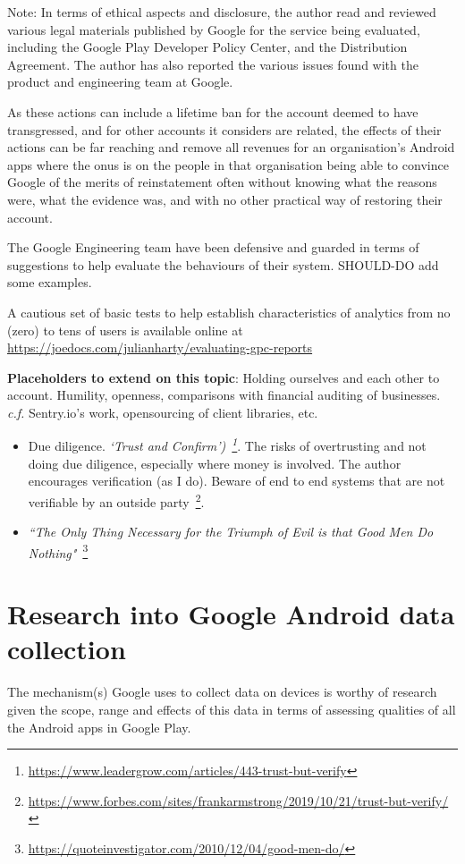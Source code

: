 Note: In terms of ethical aspects and disclosure, the author read and reviewed various legal materials published by Google for the service being evaluated, including the Google Play Developer Policy Center\citep{google_play_developer_policy_center}, and the Distribution Agreement\citep{google_play_developer_distribution_agreement}. The author has also reported the various issues found with the product and engineering team at Google.




As these actions can include a lifetime ban for the account deemed to have transgressed, and for other accounts it considers are related, the effects of their actions can be far reaching and remove all revenues for an organisation's Android apps where the onus is on the people in that organisation being able to convince Google of the merits of reinstatement often without knowing what the reasons were, what the evidence was, and with no other practical way of restoring their account.

The Google Engineering team have been defensive and guarded in terms of suggestions to help evaluate the behaviours of their system. SHOULD-DO add some examples. 

A cautious set of basic tests to help establish characteristics of analytics from no (zero) to tens of users is available online at 
\url{https://joedocs.com/julianharty/evaluating-gpc-reports}

\textbf{Placeholders to extend on this topic}: Holding ourselves and each other to account. Humility, openness, comparisons with financial auditing of businesses. \emph{c.f.} Sentry.io's work, opensourcing of client libraries, etc. 

\begin{itemize}
    \item Due diligence. \emph{`Trust and Confirm')~\footnote{\url{https://www.leadergrow.com/articles/443-trust-but-verify}}}. The risks of overtrusting and not doing due diligence, especially where money is involved. The author encourages verification (as I do). Beware of end to end systems that are not verifiable by an outside party~\footnote{\url{https://www.forbes.com/sites/frankarmstrong/2019/10/21/trust-but-verify/}}.
    \item \emph{``The Only Thing Necessary for the Triumph of Evil is that Good Men Do Nothing"}~\footnote{\url{https://quoteinvestigator.com/2010/12/04/good-men-do/}}
\end{itemize}

\section{Research into Google Android data collection}
The mechanism(s) Google uses to collect data on devices is worthy of research given the scope, range and effects of this data in terms of assessing qualities of all the Android apps in Google Play.

